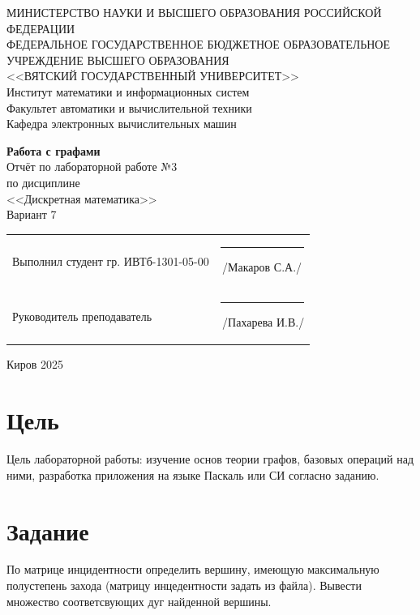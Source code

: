 \documentclass[a4paper,14pt]{extarticle}
\begin{document}
  \newpage\thispagestyle{empty}
  \begin{center}
    \MakeUppercase{
      Министерство науки и высшего образования Российской Федерации\\
      Федеральное государственное бюджетное образовательное учреждение высшего образования\\
      <<Вятский Государственный Университет>>\\
    }
    Институт математики и информационных систем\\
    Факультет автоматики и вычислительной техники\\
    Кафедра электронных вычислительных машин
  \end{center}
  \vfill

  \begin{center}
    \textbf{Работа с графами}\\
    Отчёт по лабораторной работе №3\\
    по дисциплине\\
    <<Дискретная математика>>\\
    Вариант 7
  \end{center}
  \vfill

  \noindent
  \begin{tabular}{ll}
    Выполнил студент гр. ИВТб-1301-05-00 \hspace{5mm} &
    \rule[-1mm]{25mm}{0.10mm}\,/Макаров С.А./\\
    
    Руководитель преподаватель & \rule[-1mm]{25mm}{0.10mm}\,/Пахарева И.В./\\
  \end{tabular}

  \vfill
  \begin{center}
    Киров 2025
  \end{center}

  \newpage
  \section*{\hspace{12.5mm}Цель}
  Цель лабораторной работы: изучение основ теории графов, базовых операций над ними, разработка приложения на языке Паскаль или СИ согласно заданию.

  \section*{\hspace{12.5mm}Задание}
  По матрице инцидентности определить вершину, имеющую максимальную полустепень захода (матрицу инцедентности задать из файла). Вывести множество соответсвующих дуг найденной вершины.
\end{document}
